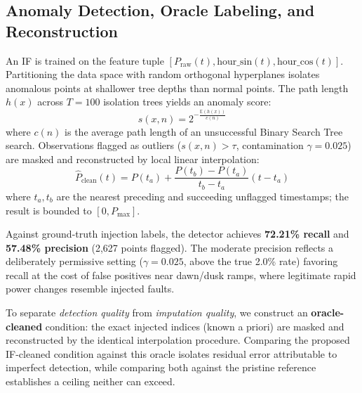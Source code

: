 \documentclass[conference]{IEEEtran}
\begin{document}
\subsection{Anomaly Detection, Oracle Labeling, and Reconstruction}
An IF is trained on the feature tuple $[P_{\text{raw}}(t), \text{hour\_sin}(t), \text{hour\_cos}(t)]$. Partitioning the data space with random orthogonal hyperplanes isolates anomalous points at shallower tree depths than normal points. The path length $h(x)$ across $T=100$ isolation trees yields an anomaly score:
\begin{equation}
s(x, n) = 2^{-\frac{\mathbb{E}(h(x))}{c(n)}}
\end{equation}
where $c(n)$ is the average path length of an unsuccessful Binary Search Tree search. Observations flagged as outliers ($s(x,n) > \tau$, contamination $\gamma = 0.025$) are masked and reconstructed by local linear interpolation:
\begin{equation}
\hat{P}_{\text{clean}}(t) = P(t_a) + \frac{P(t_b) - P(t_a)}{t_b - t_a}(t - t_a)
\end{equation}
where $t_a, t_b$ are the nearest preceding and succeeding unflagged timestamps; the result is bounded to $[0, P_{\text{max}}]$.

Against ground-truth injection labels, the detector achieves \textbf{72.21\% recall} and \textbf{57.48\% precision} (2{,}627 points flagged). The moderate precision reflects a deliberately permissive setting ($\gamma=0.025$, above the true 2.0\% rate) favoring recall at the cost of false positives near dawn/dusk ramps, where legitimate rapid power changes resemble injected faults.

To separate \emph{detection quality} from \emph{imputation quality}, we construct an \textbf{oracle-cleaned} condition: the exact injected indices (known a priori) are masked and reconstructed by the identical interpolation procedure. Comparing the proposed IF-cleaned condition against this oracle isolates residual error attributable to imperfect detection, while comparing both against the pristine reference establishes a ceiling neither can exceed.
\end{document}
